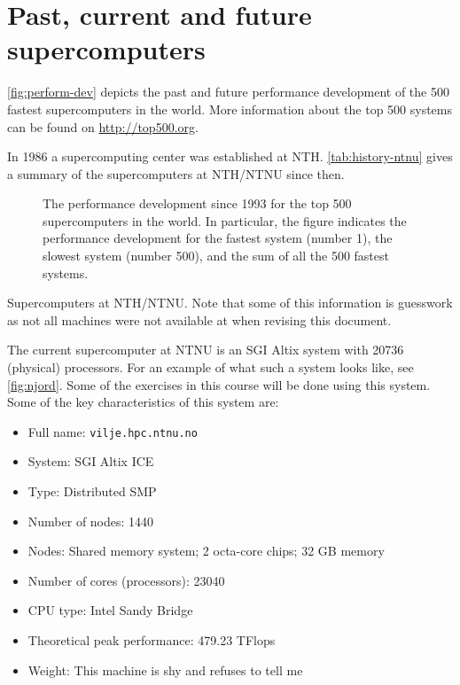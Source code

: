 \section{Past, current and future supercomputers}

\autoref{fig:perform-dev} depicts the past and future performance development
of the 500 fastest supercomputers in the world. More information about the top
500 systems can be found on \url{http://top500.org}.

In 1986 a supercomputing center was established at NTH.
\autoref{tab:history-ntnu} gives a summary of the supercomputers at NTH/NTNU
since then.

\begin{figure}
  \centering
  
  \caption{
    The performance development since 1993 for the top 500 supercomputers in the
    world. In particular, the figure indicates the performance development for
    the fastest system (number 1), the slowest system (number 500), and the sum
    of all the 500 fastest systems.
  }
  \label{fig:perform-dev}
\end{figure}

\begin{table}
  \caption{
    Supercomputers at NTH/NTNU. Note that some of this information is guesswork
    as not all machines were not available at when revising this document.
  }
  \centering
  
  \label{tab:history-ntnu}
\end{table}

The current supercomputer at NTNU is an SGI Altix system with 20736 (physical)
processors. For an example of what such a system looks like, see
\autoref{fig:njord}. Some of the exercises in this course will be done using
this system. Some of the key characteristics of this system are:
\begin{itemize}
\item Full name: \texttt{vilje.hpc.ntnu.no}
\item System: SGI Altix ICE
\item Type: Distributed SMP
\item Number of nodes: 1440
\item Nodes: Shared memory system; 2 octa-core chips; 32 GB memory
\item Number of cores (processors): 23040
\item CPU type: Intel Sandy Bridge
\item Theoretical peak performance: 479.23 TFlops
\item Weight: This machine is shy and refuses to tell me
\end{itemize}

